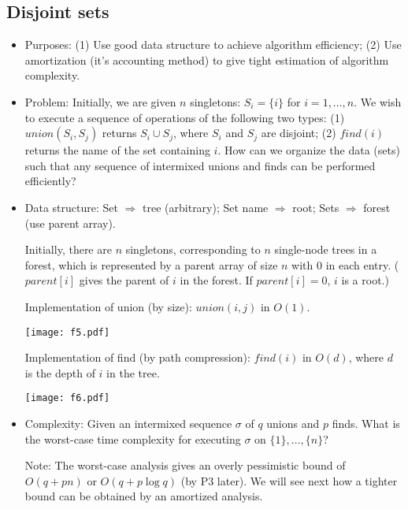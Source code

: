 \documentclass{article}
\begin{document}
\newpage
\subsection{Disjoint sets}


\begin{itemize}

\item Purposes: (1) Use good data structure to achieve algorithm efficiency;
(2) Use amortization (it's accounting method) to give tight estimation of 
algorithm complexity.

\item Problem: Initially, we are given $n$ singletons: 
$S_i=\{i\}$ for $i=1,\ldots,n$. We wish to execute a sequence of
operations of the following two types: (1) $union(S_i,S_j)$ returns
$S_i\cup S_j$, where $S_i$ and $S_j$ are disjoint; (2) $find(i)$
returns the name of the set containing $i$. How can we organize
the data (sets) such that any sequence of intermixed unions and
finds can be performed efficiently?

\item Data structure: Set $\Rightarrow$ tree (arbitrary); 
Set name $\Rightarrow$ root; Sets $\Rightarrow$ forest
(use parent array).

Initially, there are $n$ singletons, corresponding to $n$
single-node trees in a forest, which is represented by a
parent array of size $n$ with $0$ in each entry.
($parent[i]$ gives the parent of $i$ in the forest.
If $parent[i]=0$, $i$ is a root.)

Implementation of union (by size): $union(i,j)$ in $O(1)$.

\vskip 0.25cm
\begin{center}
\texttt{[image: f5.pdf]}
\end{center}

Implementation of find (by path compression): $find(i)$ in $O(d)$,
where $d$ is the depth of $i$ in the tree.

\vskip 0.25cm
\begin{center}
\texttt{[image: f6.pdf]}
\end{center}

\item Complexity: Given an intermixed sequence $\sigma$ of $q$ unions
and $p$ finds. What is the worst-case time complexity for executing
$\sigma$ on $\{1\}, \ldots, \{n\}$?

Note: The worst-case analysis gives an overly pessimistic bound of
$O(q+pn)$ or $O(q+p\log q)$ (by P3 later). We will see next how a tighter bound can be obtained
by an amortized analysis.


\end{itemize}
\end{document}
